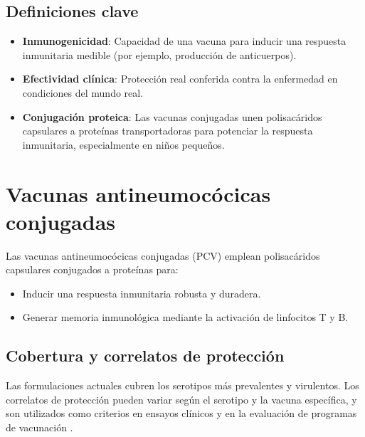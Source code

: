 \subsection{Definiciones clave}
\begin{itemize}
    \item \textbf{Inmunogenicidad}: Capacidad de una vacuna para inducir una respuesta inmunitaria medible (por ejemplo, producción de anticuerpos).
    \item \textbf{Efectividad clínica}: Protección real conferida contra la enfermedad en condiciones del mundo real.
    \item \textbf{Conjugación proteica}: Las vacunas conjugadas unen polisacáridos capsulares a proteínas transportadoras para potenciar la respuesta inmunitaria, especialmente en niños pequeños.
\end{itemize}

\section{Vacunas antineumocócicas conjugadas}


Las vacunas antineumocócicas conjugadas (PCV) emplean polisacáridos capsulares conjugados a proteínas para:
\begin{itemize}
    \item Inducir una respuesta inmunitaria robusta y duradera.
    \item Generar memoria inmunológica mediante la activación de linfocitos T y B.
\end{itemize}

\subsection{Cobertura y correlatos de protección}
Las formulaciones actuales cubren los serotipos más prevalentes y virulentos. Los correlatos de protección pueden variar según el serotipo y la vacuna específica, y son utilizados como criterios en ensayos clínicos y en la evaluación de programas de vacunación \cite{Snedecor2020a}.



